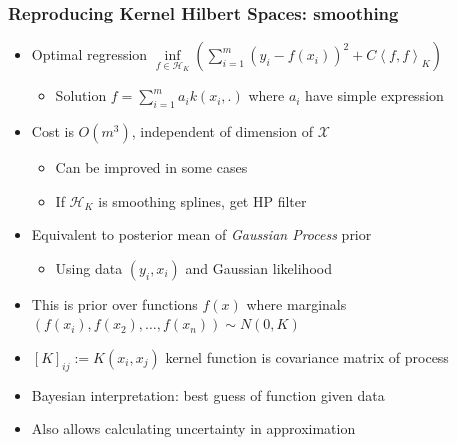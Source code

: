\documentclass[bigger]{beamer}
\begin{document}
\begin{frame}%

\frametitle{Reproducing Kernel Hilbert Spaces: smoothing}


\begin{itemize}

\item Optimal regression $\underset{f\in\mathcal{H}_K}{\inf}(\sum_{i=1}^{m}(y_i-f(x_i))^2+C\left\langle f,f\right\rangle_K)$ 
\begin{itemize}
\item Solution $f=\sum_{i=1}^{m}a_ik(x_i,.)$ where $a_i$ have simple expression
\end{itemize}
\item Cost is $O(m^3)$, independent of dimension of $\mathcal{X}$
\begin{itemize}
\item Can be improved in some cases
\item If $\mathcal{H}_K$ is smoothing splines, get HP filter
\end{itemize}
\item Equivalent to posterior mean of \emph{Gaussian Process} prior
\begin{itemize}
\item  Using data $(y_i,x_i)$ and Gaussian likelihood
\end{itemize}
\item This is prior over functions $f(x)$ where marginals $(f(x_i),f(x_2),\ldots, f(x_n))\sim N(0,K)$
\item $[K]_{ij}:=K(x_i,x_j)$  kernel function is covariance matrix of process
\item Bayesian interpretation: best guess of function given data
\item Also allows calculating uncertainty in approximation

\end{itemize}


\end{frame}%
\end{document}
